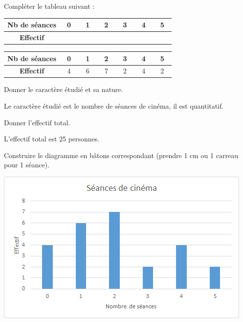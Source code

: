 \documentclass[a4paper,11pt]{exam}
\begin{document}
	\begin{questions}
		\question[2] Compléter le tableau suivant :
		
		\begin{center}
			\begin{tabular}{|@{\ }c@{\ }|@{\ }c@{\ }|@{\ }c@{\ }|@{\ }c@{\ }|@{\ }c@{\ }|@{\ }c@{\ }|@{\ }c@{\ }|}
				\hline
				\textbf{Nb de séances} & \ 0\  & \ 1\  & \ 2\  & \ 3\  & \ 4\  & \ 5\ \\
				\hline
				\textbf{Effectif} &  &   &  &  & &\\
				
				\hline
			\end{tabular}
		\end{center}
		
		\begin{solution}
			
			\begin{center}
				\begin{tabular}{|@{\ }c@{\ }|@{\ }c@{\ }|@{\ }c@{\ }|@{\ }c@{\ }|@{\ }c@{\ }|@{\ }c@{\ }|@{\ }c@{\ }|}
					\hline
					\textbf{Nb de séances} & \ 0\  & \ 1\  & \ 2\  & \ 3\  & \ 4\  & \ 5\ \\
					\hline
					\textbf{Effectif} & 4 & 6  & 7 & 2 & 4 & 2 \\
					
					\hline
				\end{tabular}
			\end{center}
			
		\end{solution}
		
		\question[1] Donner le caractère étudié et sa nature.
		\begin{solution}
			Le caractère étudié est le nombre de séances de cinéma, il est quantitatif.
		\end{solution}
		
		\question[1] Donner l'effectif total.
		\begin{solution}
			L'effectif total est 25 personnes.
		\end{solution}
		
		\question[3] Construire le diagramme en bâtons correspondant (prendre 1 cm ou 1 carreau pour 1 séance).
		\begin{solution}
			\begin{center}
				\includegraphics[scale=0.6]{./cine}
			\end{center} 
		\end{solution}
	\end{questions}
	
	\label{LastPage}
	
\end{document}
